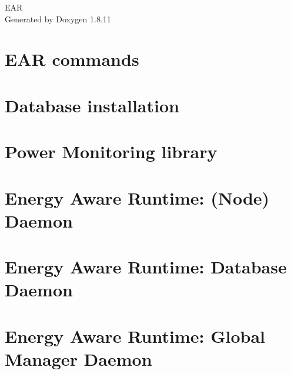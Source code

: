 \documentclass[twoside]{book}
\newcommand{\+}{\discretionary{\mbox{\scriptsize$\hookleftarrow$}}{}{}}
\newcommand{\clearemptydoublepage}{%
  \newpage{\pagestyle{empty}\cleardoublepage}%
}
\begin{document}
\hypersetup{pageanchor=false,
             bookmarksnumbered=true,
             pdfencoding=unicode
            }
\begin{titlepage}
\vspace*{7cm}
\begin{center}%
{\Large E\+AR }\\
\vspace*{1cm}
{\large Generated by Doxygen 1.8.11}\\
\end{center}
\end{titlepage}
\clearemptydoublepage
\tableofcontents
\clearemptydoublepage
{}
\hypersetup{pageanchor=true}

\chapter{E\+AR commands}
\label{md_src_commands_README}
\hypertarget{md_src_commands_README}{}

\chapter{Database installation}
\label{md_src_common_database_README}
\hypertarget{md_src_common_database_README}{}

\chapter{Power Monitoring library}
\label{md_src_common_README}
\hypertarget{md_src_common_README}{}

\chapter{Energy Aware Runtime\+: (Node) Daemon}
\label{md_src_daemon_README}
\hypertarget{md_src_daemon_README}{}

\chapter{Energy Aware Runtime\+: Database Daemon}
\label{md_src_database_cache_README}
\hypertarget{md_src_database_cache_README}{}

\chapter{Energy Aware Runtime\+: Global Manager Daemon}
\label{md_src_global_manager_README}
\hypertarget{md_src_global_manager_README}{}

\end{document}
